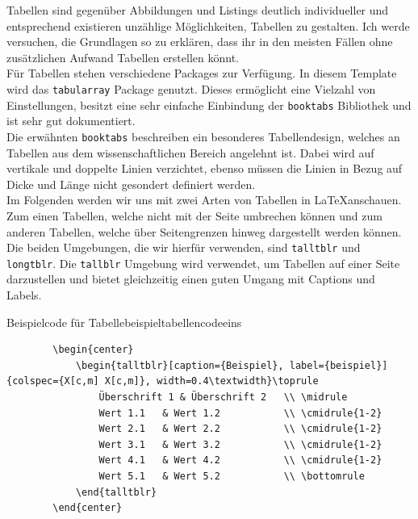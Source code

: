 Tabellen sind gegenüber Abbildungen und Listings deutlich individueller und
entsprechend existieren unzählige Möglichkeiten, Tabellen zu gestalten. Ich werde
versuchen, die Grundlagen so zu erklären, dass ihr in den meisten Fällen ohne
zusätzlichen Aufwand Tabellen erstellen könnt.\\ Für Tabellen stehen
verschiedene Packages zur Verfügung. In diesem Template wird das \texttt{tabularray}
Package genutzt. Dieses ermöglicht eine Vielzahl von Einstellungen, besitzt
eine sehr einfache Einbindung der \texttt{booktabs} Bibliothek und ist sehr gut
dokumentiert.\\ Die erwähnten \texttt{booktabs} beschreiben ein besonderes
Tabellendesign, welches an Tabellen aus dem wissenschaftlichen Bereich angelehnt
ist. Dabei wird auf vertikale und doppelte Linien verzichtet, ebenso müssen die
Linien in Bezug auf Dicke und Länge nicht gesondert definiert werden.\\ Im
Folgenden werden wir uns mit zwei Arten von Tabellen in \LaTeX anschauen. Zum
einen Tabellen, welche nicht mit der Seite umbrechen können und zum anderen
Tabellen, welche über Seitengrenzen hinweg dargestellt werden können. Die beiden
Umgebungen, die wir hierfür verwenden, sind \texttt{talltblr} und
\texttt{longtblr}. Die \texttt{tallblr} Umgebung wird verwendet, um Tabellen auf
einer Seite darzustellen und bietet gleichzeitig einen guten Umgang mit Captions
und Labels.

\begin{code}{Beispielcode für Tabelle}{beispieltabellencodeeins}
	\begin{verbatim}
		\begin{center}
			\begin{talltblr}[caption={Beispiel}, label={beispiel}]{colspec={X[c,m] X[c,m]}, width=0.4\textwidth}\toprule
				Überschrift 1 & Überschrift 2	\\ \midrule
				Wert 1.1   & Wert 1.2       	\\ \cmidrule{1-2}
				Wert 2.1   & Wert 2.2       	\\ \cmidrule{1-2}
				Wert 3.1   & Wert 3.2       	\\ \cmidrule{1-2}
				Wert 4.1   & Wert 4.2       	\\ \cmidrule{1-2}
				Wert 5.1   & Wert 5.2       	\\ \bottomrule
			\end{talltblr}
		\end{center}
	\end{verbatim}
\end{code}

